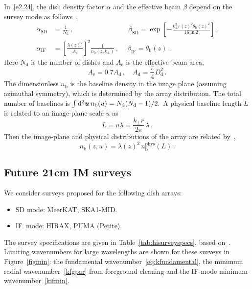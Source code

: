 In~\eqref{e2.24}, the dish density factor $\alpha$ and the effective beam $\beta$ depend on the survey mode as follows~\cite{Bull:2014rha, Obuljen:2017jiy, Ansari:2018ury, Jalilvand:2019bhk, Durrer:2020orn},
\begin{align}
\alpha_\mathrm{SD} &= \frac{1}{N_\mathrm{d}}\,,\qquad\qquad\qquad\qquad  \beta_\mathrm{SD}= \exp\left[-\frac{k_\perp^2 r(z)^2\theta_\mathrm{b}(z)^2}{16\ln 2} \right], \label{sdn} \\
\alpha_\mathrm{IF} &=\left[ \frac{\lambda(z)^2}{A_\mathrm{e}}\right]^2 \frac{1}{n_\mathrm{b}(z,k_\perp)}
\,,\quad~  \beta_\mathrm{IF}= \theta_\mathrm{b}(z)\,. \label{ifn}
\end{align}
Here $N_\mathrm{d}$ is the number of dishes  and $A_\mathrm{e}$ is the effective beam area,
\begin{equation} \label{aeff}
A_\mathrm{e} = 0.7 A_\mathrm{d}\,, \quad A_\mathrm{d} = \frac{\pi}{4} D_\mathrm{d}^2\,.
\end{equation}
The dimensionless $n_\mathrm{b}$ is the baseline density in the image plane (assuming azimuthal symmetry), which is determined by the array distribution. The total number of baselines is $\int \mathrm{d}^2{\bm u}\,n_\mathrm{b}(u) = N_\mathrm{d}(N_\mathrm{d}-1)/2.$
A physical baseline length $L$ is related to an image-plane scale $u$ as
\begin{equation}
L = u\lambda = \frac{k_\perp r}{2\pi}\,\lambda\,.
\end{equation}
Then the image-plane and physical distributions of the array are related by~\cite{Ansari:2018ury},
\begin{equation} \label{nbphy}
n_\mathrm{b}(z,u) = \lambda(z)^2\, n_\mathrm{b}^\mathrm{phys}(L)\,.
\end{equation}
%
%
\subsection{Future 21cm IM surveys}
%
We consider surveys proposed for the following dish arrays:
\begin{itemize}
\item 
SD mode:  MeerKAT, 
SKA1-MID.
\item
IF\ mode: HIRAX,
PUMA (Petite). 
\end{itemize}
The survey specifications are given in Table~\ref{tab:hisurveyspecs}, based on~\cite{Santos:2017qgq, Bacon:2018dui, Slosar:2019jwd,Karagiannis:2019jjx,Castorina:2020zhz}. Limiting wavenumbers for large wavelengths are shown for these surveys in Figure~\ref{figmin}: the fundamental wavenumber~\ref{eq:kfundamental}, the minimum radial wavenumber~\eqref{kfgpar} from foreground cleaning and the IF-mode minimum wavenumber~\eqref{kifmin}.


